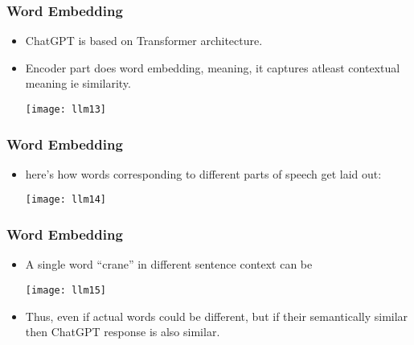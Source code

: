 \begin{frame}[fragile]\frametitle{Word Embedding}

\begin{itemize}
\item ChatGPT is based on Transformer architecture.
\item Encoder part does word embedding, meaning, it captures atleast contextual meaning ie similarity.

\begin{center}
\texttt{[image: llm13]}
\end{center}

\end{itemize}

\end{frame}


\begin{frame}[fragile]\frametitle{Word Embedding}

\begin{itemize}

\item here’s how words corresponding to different parts of speech get laid out:

\begin{center}
\texttt{[image: llm14]}
\end{center}

\end{itemize}

\end{frame}



\begin{frame}[fragile]\frametitle{Word Embedding}

\begin{itemize}

\item A single word ``crane'' in different sentence context can be 

\begin{center}
\texttt{[image: llm15]}
\end{center}

\item Thus, even if actual words could be different, but if their semantically similar then ChatGPT response is also similar.
\end{itemize}

\end{frame}

